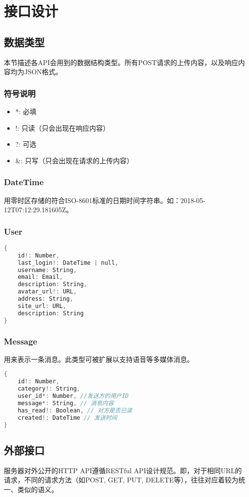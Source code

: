 \chapter{接口设计}
\section{数据类型}
本节描述各API会用到的数据结构类型。所有POST请求的上传内容，以及响应内容均为JSON格式。
\subsection{符号说明}
\begin{itemize}
    \item  *: 必填
    \item  !: 只读（只会出现在响应内容）
    \item  ?: 可选
    \item  \&: 只写（只会出现在请求的上传内容）
\end{itemize}
\subsection{DateTime}
用零时区存储的符合ISO-8601标准的日期时间字符串。如：2018-05-12T07:12:29.181605Z。
\subsection{User}
\begin{lstlisting}[language=C]
{
    id!: Number,
    last_login!: DateTime | null,
    username: String,
    email: Email,
    description: String,
    avatar_url!: URL,
    address: String,
    site_url: URL,
    description: String
}
\end{lstlisting}
\subsection{Message}
用来表示一条消息。此类型可被扩展以支持语音等多媒体消息。
\begin{lstlisting}[language=C]
{
    id!: Number,
    category!: String,
    user_id*: Number, //发送方的用户ID
    message*: String, // 消息内容
    has_read!: Boolean, // 对方是否已读
    created!: DateTime // 发送时间
}
\end{lstlisting}


\section{外部接口}
\label{sec:extif}
服务器对外公开的HTTP API遵循RESTful API设计规范。即，对于相同URL的请求，不同的请求方法（如POST, GET, PUT, DELETE等），往往对应着较为统一、类似的语义。

